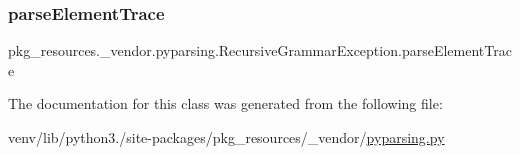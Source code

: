 \subsubsection{\texorpdfstring{parse\+Element\+Trace}{parseElementTrace}}
{\footnotesize\ttfamily pkg\+\_\+resources.\+\_\+vendor.\+pyparsing.\+Recursive\+Grammar\+Exception.\+parse\+Element\+Trace}



The documentation for this class was generated from the following file\+:\begin{DoxyCompactItemize}
\item 
venv/lib/python3./site-\/packages/pkg\+\_\+resources/\+\_\+vendor/\hyperlink{pkg__resources_2__vendor_2pyparsing_8py}{pyparsing.\+py}\end{DoxyCompactItemize}
